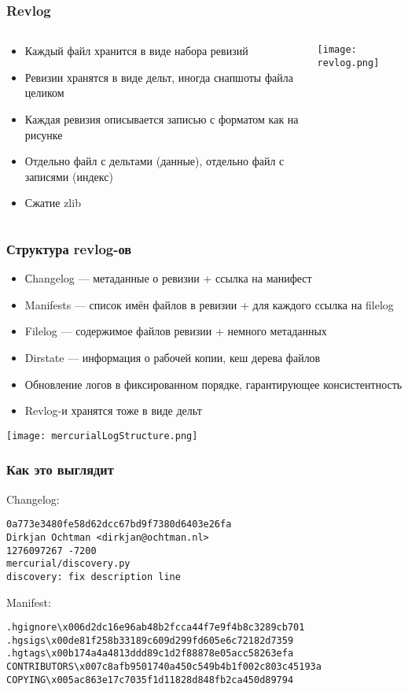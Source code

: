\documentclass{../../slides-style}
\begin{document}
	\begin{frame}
		\frametitle{Revlog}
		\begin{columns}
			\begin{column}{0.6\textwidth}
				\begin{itemize}
					\item Каждый файл хранится в виде набора ревизий
					\item Ревизии хранятся в виде дельт, иногда снапшоты файла целиком
					\item Каждая ревизия описывается записью с форматом как на рисунке
					\item Отдельно файл с дельтами (данные), отдельно файл с записями (индекс)
					\item Сжатие zlib
				\end{itemize}
			\end{column}
			\begin{column}{0.4\textwidth}
				\begin{center}
					\texttt{[image: revlog.png]}
				\end{center}
			\end{column}
		\end{columns}
	\end{frame}

	\begin{frame}
		\frametitle{Структура revlog-ов}
		\begin{itemize}
			\item Сhangelog --- метаданные о ревизии + ссылка на манифест
			\item Manifests --- список имён файлов в ревизии + для каждого ссылка на filelog
			\item Filelog --- содержимое файлов ревизии + немного метаданных
			\item Dirstate --- информация о рабочей копии, кеш дерева файлов
			\item Обновление логов в фиксированном порядке, гарантирующее консистентность
			\item Revlog-и хранятся тоже в виде дельт
		\end{itemize}
		\begin{center}
			\texttt{[image: mercurialLogStructure.png]}
		\end{center}
	\end{frame}

	\begin{frame}[fragile]
		\frametitle{Как это выглядит}
		Changelog:
		\begin{verbatim}
0a773e3480fe58d62dcc67bd9f7380d6403e26fa
Dirkjan Ochtman <dirkjan@ochtman.nl>
1276097267 -7200
mercurial/discovery.py
discovery: fix description line
		\end{verbatim}
		\vspace{3mm}
		Manifest:
		\begin{verbatim}
.hgignore\x006d2dc16e96ab48b2fcca44f7e9f4b8c3289cb701
.hgsigs\x00de81f258b33189c609d299fd605e6c72182d7359
.hgtags\x00b174a4a4813ddd89c1d2f88878e05acc58263efa
CONTRIBUTORS\x007c8afb9501740a450c549b4b1f002c803c45193a
COPYING\x005ac863e17c7035f1d11828d848fb2ca450d89794
		\end{verbatim}
	\end{frame}
\end{document}
